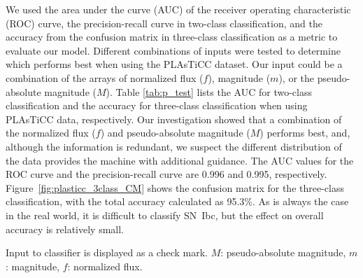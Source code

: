 \documentclass[useamsfonts]{pasj01}
\begin{document}
We used the area under the curve (AUC) of the receiver operating characteristic (ROC) curve, the precision-recall curve in two-class classification, and the accuracy from the confusion matrix in three-class classification as a metric to evaluate our model.
Different combinations of inputs were tested to determine which performs best when using the PLAsTiCC dataset. Our input could be a combination of the arrays of normalized flux ($f$), magnitude ($m$), or the pseudo-absolute magnitude ($M$).
Table \ref{tab:p_test} lists the AUC for two-class classification and the accuracy for three-class classification when using PLAsTiCC data, respectively.
Our investigation showed that a combination of the normalized flux ($f$) and pseudo-absolute magnitude ($M$) performs best, and, although the information is redundant, we suspect the different distribution of the data provides the machine with additional guidance.
The AUC values for the ROC curve and the precision-recall curve are 0.996 and 0.995, respectively.
Figure\ \ref{fig:plasticc_3class_CM} shows the confusion matrix for the three-class classification, with the total accuracy calculated as 95.3\%.
As is always the case in the real world, it is difficult to classify SN~Ibc, but the effect on overall accuracy is relatively small.
%
\begin{table}[htbp]
\label{tab:p_test}
\begin{tabnote}
\footnotemark[$*$] Input to classifier is displayed as a check mark. $M$: pseudo-absolute magnitude, $m$: magnitude, $f$: normalized flux.
\end{tabnote}
\end{table}
\end{document}
